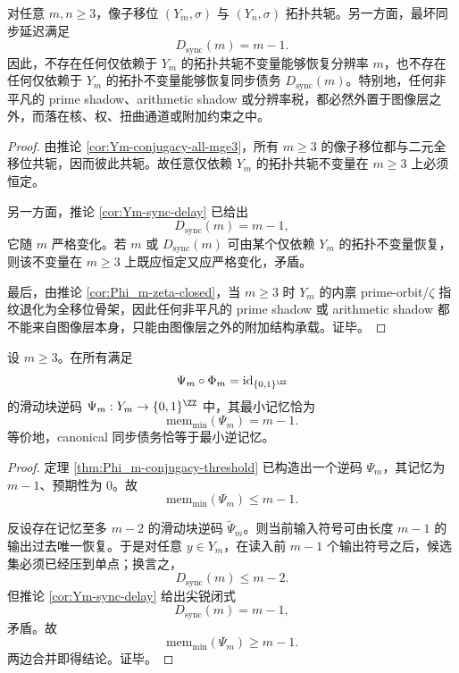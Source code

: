 \begin{theorem}[图像层的分辨率湮没与同步债务外置]\label{thm:conclusion-image-layer-resolution-annihilation-sync-externality}
对任意 \(m,n\ge 3\)，像子移位 \((Y_m,\sigma)\) 与 \((Y_n,\sigma)\) 拓扑共轭。另一方面，最坏同步延迟满足
\[
D_{\mathrm{sync}}(m)=m-1.
\]
因此，不存在任何仅依赖于 \(Y_m\) 的拓扑共轭不变量能够恢复分辨率 \(m\)，也不存在任何仅依赖于 \(Y_m\) 的拓扑不变量能够恢复同步债务 \(D_{\mathrm{sync}}(m)\)。特别地，任何非平凡的 prime shadow、arithmetic shadow 或分辨率税，都必然外置于图像层之外，而落在核、权、扭曲通道或附加约束之中。
\end{theorem}
\begin{proof}
由推论 \ref{cor:Ym-conjugacy-all-mge3}，所有 \(m\ge 3\) 的像子移位都与二元全移位共轭，因而彼此共轭。故任意仅依赖 \(Y_m\) 的拓扑共轭不变量在 \(m\ge 3\) 上必须恒定。

另一方面，推论 \ref{cor:Ym-sync-delay} 已给出
\[
D_{\mathrm{sync}}(m)=m-1,
\]
它随 \(m\) 严格变化。若 \(m\) 或 \(D_{\mathrm{sync}}(m)\) 可由某个仅依赖 \(Y_m\) 的拓扑不变量恢复，则该不变量在 \(m\ge 3\) 上既应恒定又应严格变化，矛盾。

最后，由推论 \ref{cor:Phi_m-zeta-closed}，当 \(m\ge 3\) 时 \(Y_m\) 的内禀 prime-orbit/\(\zeta\) 指纹退化为全移位骨架，因此任何非平凡的 prime shadow 或 arithmetic shadow 都不能来自图像层本身，只能由图像层之外的附加结构承载。证毕。
\end{proof}

\begin{theorem}[逆码记忆的极小性]\label{thm:conclusion-image-layer-minimal-inverse-memory}
设 \(m\ge 3\)。在所有满足
\[
\Psi_m\circ\Phi_m=\mathrm{id}_{\{0,1\}^{\ZZ}}
\]
的滑动块逆码 \(\Psi_m:Y_m\to\{0,1\}^{\ZZ}\) 中，其最小记忆恰为
\[
\mathrm{mem}_{\min}(\Psi_m)=m-1.
\]
等价地，canonical 同步债务恰等于最小逆记忆。
\end{theorem}
\begin{proof}
定理 \ref{thm:Phi_m-conjugacy-threshold} 已构造出一个逆码 \(\Psi_m\)，其记忆为 \(m-1\)、预期性为 \(0\)。故
\[
\mathrm{mem}_{\min}(\Psi_m)\le m-1.
\]

反设存在记忆至多 \(m-2\) 的滑动块逆码 \(\widetilde\Psi_m\)。则当前输入符号可由长度 \(m-1\) 的输出过去唯一恢复。于是对任意 \(y\in Y_m\)，在读入前 \(m-1\) 个输出符号之后，候选集必须已经压到单点；换言之，
\[
D_{\mathrm{sync}}(m)\le m-2.
\]
但推论 \ref{cor:Ym-sync-delay} 给出尖锐闭式
\[
D_{\mathrm{sync}}(m)=m-1,
\]
矛盾。故
\[
\mathrm{mem}_{\min}(\Psi_m)\ge m-1.
\]
两边合并即得结论。证毕。
\end{proof}
